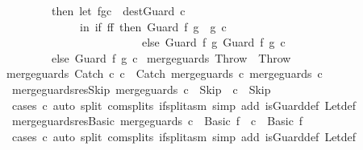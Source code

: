 \begin{isabellebody}
\ \ \ \ \ \ \ \ then\ let\ {\isacharparenleft}f{\isacharprime}{\isacharcomma}g{\isacharprime}{\isacharcomma}c{\isacharprime}{\isacharprime}{\isacharparenright}\ {\isacharequal}\ dest{\isacharunderscore}Guard\ c{\isacharprime}\ \isanewline
\ \ \ \ \ \ \ \ \ \ \ \ \ in\ if\ f{\isacharequal}f{\isacharprime}\ then\ Guard\ f\ {\isacharparenleft}g\ {\isasyminter}\ g{\isacharprime}{\isacharparenright}\ c{\isacharprime}{\isacharprime}\ \isanewline
\ \ \ \ \ \ \ \ \ \ \ \ \ \ \ \ \ \ \ \ \ \ \ \ else\ Guard\ f\ g\ {\isacharparenleft}Guard\ f{\isacharprime}\ g{\isacharprime}\ c{\isacharprime}{\isacharprime}{\isacharparenright}\isanewline
\ \ \ \ \ \ \ \ else\ Guard\ f\ g\ c{\isacharprime}{\isacharparenright}{\isachardoublequoteclose}\ {\isacharbar}\isanewline
{\isachardoublequoteopen}merge{\isacharunderscore}guards\ Throw\ {\isacharequal}\ Throw{\isachardoublequoteclose}\ {\isacharbar}\isanewline
{\isachardoublequoteopen}merge{\isacharunderscore}guards\ {\isacharparenleft}Catch\ c\ c\ {\isacharequal}\ Catch\ {\isacharparenleft}merge{\isacharunderscore}guards\ c\ {\isacharparenleft}merge{\isacharunderscore}guards\ c\isanewline
\isanewline
{}\isamarkupfalse%
\ merge{\isacharunderscore}guards{\isacharunderscore}res{\isacharunderscore}Skip{\isacharcolon}\ {\isachardoublequoteopen}merge{\isacharunderscore}guards\ c\ {\isacharequal}\ Skip\ {\isasymLongrightarrow}\ c\ {\isacharequal}\ Skip{\isachardoublequoteclose}\isanewline
%
\isadelimproof
\ \ %
\endisadelimproof
%
\isatagproof
{}\isamarkupfalse%
\ {\isacharparenleft}cases\ c{\isacharparenright}\ {\isacharparenleft}auto\ split{\isacharcolon}\ com{\isachardot}splits\ if{\isacharunderscore}split{\isacharunderscore}asm\ simp\ add{\isacharcolon}\ is{\isacharunderscore}Guard{\isacharunderscore}def\ Let{\isacharunderscore}def{\isacharparenright}%
\endisatagproof
{\isafoldproof}%
%
\isadelimproof
\isanewline
%
\endisadelimproof
\isanewline
{}\isamarkupfalse%
\ merge{\isacharunderscore}guards{\isacharunderscore}res{\isacharunderscore}Basic{\isacharcolon}\ {\isachardoublequoteopen}merge{\isacharunderscore}guards\ c\ {\isacharequal}\ Basic\ f\ {\isasymLongrightarrow}\ c\ {\isacharequal}\ Basic\ f{\isachardoublequoteclose}\isanewline
%
\isadelimproof
\ \ %
\endisadelimproof
%
\isatagproof
{}\isamarkupfalse%
\ {\isacharparenleft}cases\ c{\isacharparenright}\ {\isacharparenleft}auto\ split{\isacharcolon}\ com{\isachardot}splits\ if{\isacharunderscore}split{\isacharunderscore}asm\ simp\ add{\isacharcolon}\ is{\isacharunderscore}Guard{\isacharunderscore}def\ Let{\isacharunderscore}def{\isacharparenright}%

\end{isabellebody}
